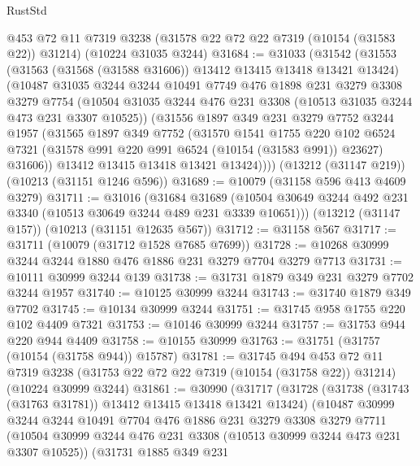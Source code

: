 \begin{lexlean}{RustStd}
\begin{coremodule}
    @453
    @72
    @11
    @7319
    @3238
    (@31578 @22 @72 @22 @7319 (@10154 (@31583 @22)) @31214)
    (@10224 @31035 @3244)
@31684 := @31033
    (@31542
      (@31553
        (@31563 (@31568 (@31588 @31606)) @13412 @13415 @13418 @13421 @13424)
        (@10487
          @31035
          @3244
          @3244
          @10491
          @7749
          @476
          @1898
          @231
          @3279
          @3308
          @3279
          @7754
          (@10504 @31035 @3244 @476 @231 @3308 (@10513 @31035 @3244 @473 @231 @3307 @10525))
          (@31556
            @1897
            @349
            @231
            @3279
            @7752
            @3244
            @1957
            (@31565
              @1897
              @349
              @7752
              (@31570
                @1541
                @1755
                @220
                @102
                @6524
                @7321
                (@31578 @991 @220 @991 @6524 (@10154 (@31583 @991)) @23627)
                @31606))
            @13412
            @13415
            @13418
            @13421
            @13424))))
    (@13212 (@31147 @219))
    (@10213 (@31151 @1246 @596))
@31689 := @10079 (@31158 @596 @413 @4609 @3279)
@31711 := @31016
    (@31684
      @31689
      (@10504 @30649 @3244 @492 @231 @3340 (@10513 @30649 @3244 @489 @231 @3339 @10651)))
    (@13212 (@31147 @157))
    (@10213 (@31151 @12635 @567))
@31712 := @31158 @567
@31717 := @31711 (@10079 (@31712 @1528 @7685 @7699))
@31728 := @10268 @30999 @3244 @3244 @1880 @476 @1886 @231 @3279 @7704 @3279 @7713
@31731 := @10111 @30999 @3244 @139
@31738 := @31731 @1879 @349 @231 @3279 @7702 @3244 @1957
@31740 := @10125 @30999 @3244
@31743 := @31740 @1879 @349 @7702
@31745 := @10134 @30999 @3244
@31751 := @31745 @958 @1755 @220 @102 @4409 @7321
@31753 := @10146 @30999 @3244
@31757 := @31753 @944 @220 @944 @4409
@31758 := @10155 @30999
@31763 := @31751 (@31757 (@10154 (@31758 @944)) @15787)
@31781 := @31745
    @494
    @453
    @72
    @11
    @7319
    @3238
    (@31753 @22 @72 @22 @7319 (@10154 (@31758 @22)) @31214)
    (@10224 @30999 @3244)
@31861 := @30990
    (@31717
      (@31728
        (@31738 (@31743 (@31763 @31781)) @13412 @13415 @13418 @13421 @13424)
        (@10487
          @30999
          @3244
          @3244
          @10491
          @7704
          @476
          @1886
          @231
          @3279
          @3308
          @3279
          @7711
          (@10504 @30999 @3244 @476 @231 @3308 (@10513 @30999 @3244 @473 @231 @3307 @10525))
          (@31731
            @1885
            @349
            @231

\end{coremodule}
\end{lexlean}
